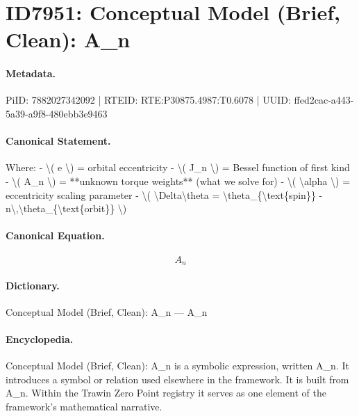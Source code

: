 \section*{ID7951: Conceptual Model (Brief, Clean): A\_n}
\paragraph{Metadata.}
PiID: 7882027342092 | RTEID: RTE:P30875.4987:T0.6078 | UUID: ffed2cac-a443-5a39-a9f8-480ebb3e9463

\paragraph{Canonical Statement.}
Where: - \textbackslash{}( e \textbackslash{}) = orbital eccentricity - \textbackslash{}( J\_n \textbackslash{}) = Bessel function of first kind - \textbackslash{}( A\_n \textbackslash{}) = **unknown torque weights** (what we solve for) - \textbackslash{}( \textbackslash{}alpha \textbackslash{}) = eccentricity scaling parameter - \textbackslash{}( \textbackslash{}Delta\textbackslash{}theta = \textbackslash{}theta\_\{\textbackslash{}text\{spin\}\} - n\textbackslash{},\textbackslash{}theta\_\{\textbackslash{}text\{orbit\}\} \textbackslash{})

\paragraph{Canonical Equation.}
\[
A_n
\]

\paragraph{Dictionary.}
Conceptual Model (Brief, Clean): A\_n — A\_n

\paragraph{Encyclopedia.}
Conceptual Model (Brief, Clean): A\_n is a symbolic expression, written A\_n. It introduces a symbol or relation used elsewhere in the framework. It is built from A\_n. Within the Trawin Zero Point registry it serves as one element of the framework's mathematical narrative.
